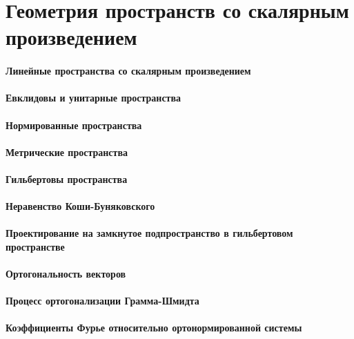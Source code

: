 \documentclass[russian,twocolumn]{article}
\begin{document}
\section{Геометрия пространств со скалярным произведением}

\paragraph{Линейные пространства со скалярным произведением}

\paragraph{Евклидовы и унитарные пространства}

\paragraph{Нормированные пространства}

\paragraph{Метрические пространства}

\paragraph{Гильбертовы пространства}

\paragraph{Неравенство Коши-Буняковского}

\paragraph{Проектирование на замкнутое подпространство в гильбертовом пространстве}

\paragraph{Ортогональность векторов}

\paragraph{Процесс ортогонализации Грамма-Шмидта}

\paragraph{Коэффициенты Фурье относительно ортонормированной системы}
\end{document}
